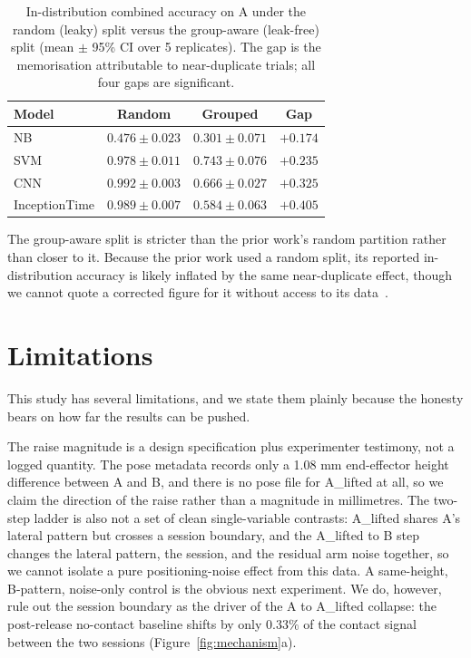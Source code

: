 \documentclass[journal]{IEEEtran}
\let\MYoriglatexcaption\caption
\renewcommand{\caption}[2][\relax]{\MYoriglatexcaption[#2]{#2}}
\begin{document}
\begin{table}[t]
\centering
\caption{In-distribution combined accuracy on A under the random (leaky) split
versus the group-aware (leak-free) split (mean $\pm$ 95\% CI over 5 replicates).
The gap is the memorisation attributable to near-duplicate trials; all four gaps
are significant.}
\label{tab:memgap}
\begin{tabular}{lccc}
\toprule
Model & Random & Grouped & Gap \\
\midrule
NB            & $0.476 \pm 0.023$ & $0.301 \pm 0.071$ & $+0.174$ \\
SVM           & $0.978 \pm 0.011$ & $0.743 \pm 0.076$ & $+0.235$ \\
CNN           & $0.992 \pm 0.003$ & $0.666 \pm 0.027$ & $+0.325$ \\
InceptionTime & $0.989 \pm 0.007$ & $0.584 \pm 0.063$ & $+0.405$ \\
\bottomrule
\end{tabular}
\end{table}


The group-aware split is stricter than the prior work's random partition rather
than closer to it. Because the prior work used a random split, its reported
in-distribution accuracy is likely inflated by the same near-duplicate effect,
though we cannot quote a corrected figure for it without access to its
data~\cite{cmd_source}.

\section{Limitations} %
\label{sec:limitations}

This study has several limitations, and we state them plainly because the honesty
bears on how far the results can be pushed.

The raise magnitude is a design specification plus experimenter testimony, not a
logged quantity. The pose metadata records only a 1.08 mm end-effector height
difference between A and B, and there is no pose file for A\_lifted at all, so we
claim the direction of the raise rather than a magnitude in millimetres. The
two-step ladder is also not a set of clean single-variable contrasts: A\_lifted
shares A's lateral pattern but crosses a session boundary, and the A\_lifted to B
step changes the lateral pattern, the session, and the residual arm noise together,
so we cannot isolate a pure positioning-noise effect from this data. A same-height,
B-pattern, noise-only control is the obvious next experiment. We do, however, rule
out the session boundary as the driver of the A to A\_lifted collapse: the
post-release no-contact baseline shifts by only $0.33\%$ of the contact signal
between the two sessions (Figure~\ref{fig:mechanism}a).
\end{document}
